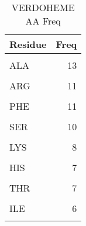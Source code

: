 	\begin{table}
		\caption{VERDOHEME AA Freq}
		\label{tbl:VERDOHEME_aaFreq}
		\centering
		\begin{tabular}{lr}
			\toprule
			Residue & Freq\\
			\midrule
			\cellcolor{gray!6}{LEU} & \cellcolor{gray!6}{16}\\
			ALA & 13\\
			\cellcolor{gray!6}{TYR} & \cellcolor{gray!6}{13}\\
			ARG & 11\\
			\cellcolor{gray!6}{GLY} & \cellcolor{gray!6}{11}\\
			\addlinespace
			PHE & 11\\
			\cellcolor{gray!6}{GLU} & \cellcolor{gray!6}{10}\\
			SER & 10\\
			\cellcolor{gray!6}{VAL} & \cellcolor{gray!6}{9}\\
			LYS & 8\\
			\addlinespace
			\cellcolor{gray!6}{ASN} & \cellcolor{gray!6}{7}\\
			HIS & 7\\
			\cellcolor{gray!6}{MET} & \cellcolor{gray!6}{7}\\
			THR & 7\\
			\cellcolor{gray!6}{GLN} & \cellcolor{gray!6}{6}\\
			\addlinespace
			ILE & 6\\
			\cellcolor{gray!6}{ASP} & \cellcolor{gray!6}{4}\\
			\bottomrule
		\end{tabular}
	\end{table}

